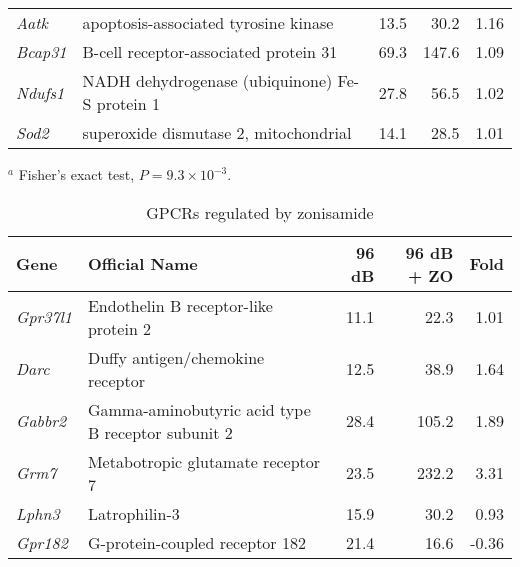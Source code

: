 \documentclass{article}
\begin{document}
\begin{table}
\begin{small}
\begin{tabular}{l p{2.5in }rrr}
{\it Aatk}&apoptosis-associated tyrosine kinase&13.5&30.2&1.16\\
{\it Bcap31}&B-cell receptor-associated protein 31&69.3&147.6&1.09\\
{\it Ndufs1}&NADH dehydrogenase (ubiquinone) Fe-S protein 1&27.8&56.5&1.02\\
{\it Sod2}&superoxide dismutase 2, mitochondrial&14.1&28.5&1.01\\
\hline
\end{tabular}
$^a$ Fisher's exact test, $P=9.3\times 10^{-3}$.
\end{small}
\label{tab:zoupapop}
\end{table}

\begin{table} 
\caption{GPCRs regulated by zonisamide}
\begin{small}
\begin{tabular}{l p{2.5in }rrr}
  \hline
 Gene& Official Name & 96 dB & 96 dB + ZO & Fold \\ 
  \hline
{\it Gpr37l1} &Endothelin B receptor-like protein 2&11.1&22.3&1.01\\
{\it Darc} &Duffy antigen/chemokine receptor&12.5&38.9&1.64\\
{\it Gabbr2} &Gamma-aminobutyric acid type B receptor subunit 2&28.4&105.2&1.89\\
{\it Grm7} &Metabotropic glutamate receptor 7&23.5&232.2&3.31\\
{\it Lphn3} & Latrophilin-3 &15.9 &  30.2 & 0.93 \\
{\it Gpr182} & G-protein-coupled receptor 182&21.4 &   16.6 &         -0.36 \\

\hline
\end{tabular}
\end{small}
\label{tab:zogpcr}
\end{table}
\end{document}
